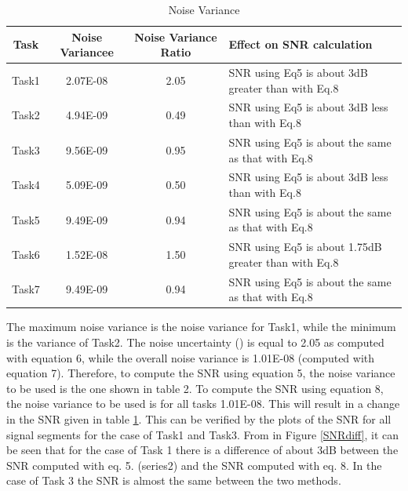 \begin{table}[hbt!]
	\caption{Noise Variance}
	\label{noise}
	\centering
	\begin{tabular}{|c|c|c|l|}
	\hline
		Task &Noise Variancee & Noise Variance Ratio & Effect on SNR calculation\\
		 \hline\hline
		Task1 & 2.07E-08 & 2.05 &	SNR using Eq5 is about 3dB greater than  with Eq.8\\
		Task2 & 4.94E-09 & 0.49 &	SNR using Eq5 is about 3dB less than  with Eq.8\\
		Task3 & 9.56E-09 & 0.95 &	SNR using Eq5 is about the same as that with Eq.8\\
		Task4 & 5.09E-09 & 0.50 &	SNR using Eq5 is about 3dB less than  with Eq.8\\
		Task5 & 9.49E-09 & 0.94 &	SNR using Eq5 is about the same as that with Eq.8\\
		Task6 & 1.52E-08 & 1.50 &	SNR using Eq5 is about 1.75dB greater than  with Eq.8\\
		Task7 & 9.49E-09 & 0.94 &	SNR using Eq5 is about the same as that with Eq.8\\
		 \hline
	\end{tabular}
\end{table}


The maximum noise variance is the noise variance for Task1, while the minimum is the variance of Task2. The noise uncertainty (\textrho) is equal to 2.05 as computed with equation 6, while the overall noise variance is 1.01E-08 (computed with equation 7). Therefore, to compute the SNR using equation 5, the noise variance to be used is the one shown in table 2. To compute the SNR using equation 8, the noise variance to be used is for all tasks 1.01E-08. This will result in a change in the SNR given in table \ref{noise}. This can be verified by the plots of the SNR for all signal segments for the case of Task1 and Task3. From in Figure \ref{SNRdiff}, it can be seen that for the case of Task 1 there is a difference of about 3dB between the SNR computed with eq. 5. (series2) and the SNR computed with eq. 8. In the case of Task 3 the SNR is almost the same between the two methods. 


